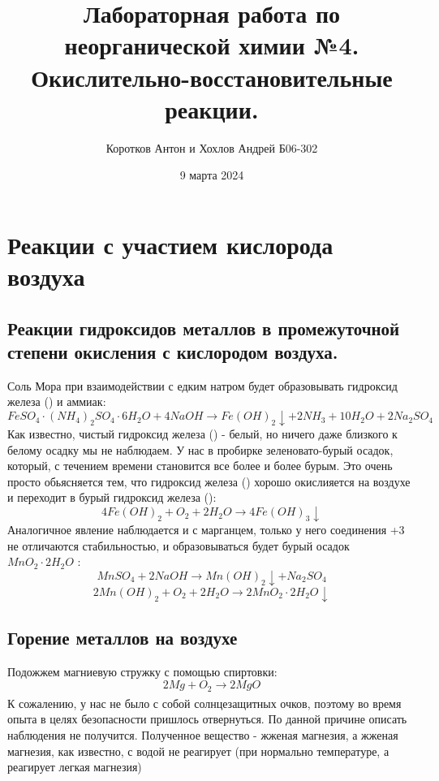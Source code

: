 \documentclass[a4paper, 12pt]{article}
\title{\textbf{Лабораторная работа по неорганической химии №4. Окислительно-восстановительные реакции.}}
\author{Коротков Антон и Хохлов Андрей Б06-302}
\date{9 марта 2024}
\newcommand{\RomanNumeralCaps}[1]
    {\MakeUppercase{\romannumeral #1}}
\begin{document}
	
	\maketitle
	
	\section{Реакции с участием кислорода воздуха}
 \subsection{Реакции гидроксидов металлов в промежуточной степени окисления с кислородом воздуха.}
 Соль Мора при взаимодействии с едким натром будет образовывать гидроксид железа (\RomanNumeralCaps{2}) и аммиак:
 \begin{equation}
     FeSO_4 \cdot (NH_4)_2SO_4\cdot 6H_2O + 4NaOH \xrightarrow{} Fe(OH)_2 \downarrow + 2NH_3 + 10H_2O + 2Na_2SO_4
 \end{equation}
 Как известно, чистый гидроксид железа (\RomanNumeralCaps{2}) - белый, но ничего даже близкого к белому осадку мы не наблюдаем. У нас в пробирке зеленовато-бурый осадок, который, с течением времени становится все более и более бурым. Это очень просто обьясняется тем, что гидроксид железа (\RomanNumeralCaps{2}) хорошо окислияется на воздухе и переходит в бурый гидроксид железа (\RomanNumeralCaps{3}):
 \begin{equation}
     4Fe(OH)_2 + O_2 + 2H_2O \xrightarrow{} 4Fe(OH)_3 \downarrow
 \end{equation}
 Аналогичное явление наблюдается и с марганцем, только у него соединения +3 не отличаются стабильностью, и образовываться будет бурый осадок $MnO_2 \cdot 2H_2O$ :
 \begin{equation}
     MnSO_4 + 2NaOH \xrightarrow{} Mn(OH)_2 \downarrow + Na_2SO_4
 \end{equation}
 \begin{equation}
     2Mn(OH)_2 + O_2 + 2H_2O \xrightarrow{} 2MnO_2 \cdot 2H_2O \downarrow
 \end{equation}
 \subsection{Горение металлов на воздухе}
 Подожжем магниевую стружку с помощью спиртовки:
 \begin{equation}
     2Mg + O_2 \xrightarrow[]{} 2MgO
 \end{equation}
К сожалению, у нас не было с собой солнцезащитных очков, поэтому во время опыта в целях безопасности пришлось отвернуться. По данной причине описать наблюдения не получится. \newline
Полученное вещество - жженая магнезия, а жженая магнезия, как известно, с водой не реагирует (при нормально температуре, а реагирует легкая магнезия)
\end{document}
